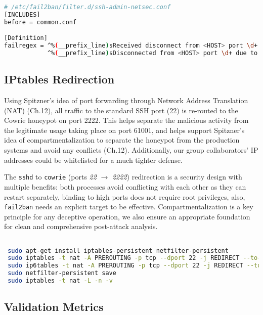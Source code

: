 \documentclass{cls/ULBreport}
\begin{document}
        \begin{lstlisting}[language=bash,caption={Regex Filter Against Key-Based Attacks}]
 # /etc/fail2ban/filter.d/ssh-admin-netsec.conf
[INCLUDES]
before = common.conf

[Definition]
failregex = ^%(__prefix_line)sReceived disconnect from <HOST> port \d+: Too many authentication failures
            ^%(__prefix_line)sDisconnected from <HOST> port \d+ due to: Authentication failed for .* publickey
        \end{lstlisting}
        
        
        \subsection{IPtables Redirection}
        Using Spitzner's idea of port forwarding through Network Address Translation (NAT) (Ch.12), all traffic to the standard SSH port (22) is re-routed to the Cowrie honeypot on port 2222. This helps separate the malicious activity from the legitimate usage taking place on port 61001, and helps support Spitzner's idea of compartmentalization to separate the honeypot from the production systems and avoid any conflicts (Ch.12). Additionally, our group collaborators' IP addresses could be whitelisted for a much tighter defense. 
        
        The \texttt{sshd} to \texttt{cowrie} ({ports \textit{22}} $\rightarrow$ \textit{2222}) redirection is a security design with multiple benefits: both processes avoid conflicting with each other as they can restart separately, binding to high ports does not require root privileges, also, \texttt{fail2ban} needs an explicit target to be effective. Compartmentalization is a key principle for any deceptive operation, we also ensure an appropriate foundation for clean and comprehensive post-attack analysis.
        \begin{lstlisting}[language=bash,caption={Traffic Redirection to Cowrie}]

 sudo apt-get install iptables-persistent netfilter-persistent
 sudo iptables -t nat -A PREROUTING -p tcp --dport 22 -j REDIRECT --to-port 2222
 sudo ip6tables -t nat -A PREROUTING -p tcp --dport 22 -j REDIRECT --to-port 2222
 sudo netfilter-persistent save
 sudo iptables -t nat -L -n -v
        \end{lstlisting}
        

        
        \subsection{Validation Metrics}  
        \label{sec:validation}  
        
\end{document}
